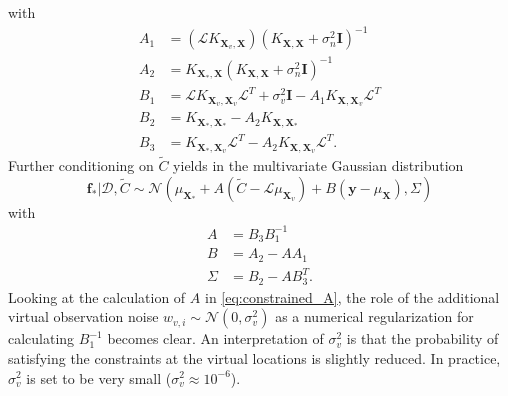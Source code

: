 with
\begin{align}
    A_1 &= (\mathcal{L}K_{\mathbf{X}_v,\mathbf{X}}) \left(K_{\mathbf{X},\mathbf{X}} + \sigma_n^2\mathbf{I} \right)^{-1} \label{eq:A1}\\
    A_2 &= K_{\mathbf{X}_*,\mathbf{X}} \left(K_{\mathbf{X},\mathbf{X}} + \sigma_n^2\mathbf{I} \right)^{-1} \\
    B_1 &= \mathcal{L}K_{\mathbf{X}_v,\mathbf{X}_v}\mathcal{L}^T + \sigma_v^2\mathbf{I} - A_1 K_{\mathbf{X},\mathbf{X}_v}\mathcal{L}^T \\
    B_2 &= K_{\mathbf{X}_*,\mathbf{X}_*} - A_2 K_{\mathbf{X},\mathbf{X}_*} \\
    B_3 &= K_{\mathbf{X}_*,\mathbf{X}_v}\mathcal{L}^T - A_2 K_{\mathbf{X},\mathbf{X}_v}\mathcal{L}^T\label{eq:B3}.
\end{align}
Further conditioning on $\tilde{C}$ yields in the multivariate Gaussian distribution
\begin{equation}
    \mathbf{f_*} | \mathcal{D}, \tilde{C} \sim \mathcal{N} \left(\mu_{\mathbf{X}_*} + A (\tilde{C} - \mathcal{L}\mu_{\mathbf{X}_v}) + B (\mathbf{y} - \mu_{\mathbf{X}}), \Sigma \right)
\end{equation}
with
\begin{align}
    A &= B_3 B_1^{-1} \label{eq:constrained_A}\\
    B &= A_2 - A A_1 \\
    \Sigma &= B_2 - A B_3^T.
\end{align}
Looking at the calculation of $A$ in \eqref{eq:constrained_A}, the role of the additional virtual observation noise $w_{v,i} \sim \mathcal{N}(0, \sigma_v^2)$ as a numerical regularization for calculating $B_1^{-1}$ becomes clear. An interpretation of $\sigma_v^2$ is that the probability of satisfying the constraints at the virtual locations is slightly reduced. In practice, $\sigma_v^2$ is set to be very small ($\sigma_v^2\approx 10^{-6}$).

